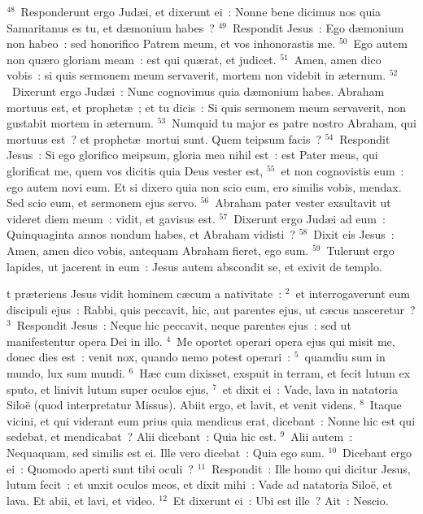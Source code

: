 ${}^{48}$~Responderunt ergo Jud\ae i, et dixerunt ei~: Nonne bene dicimus nos quia Samaritanus es tu, et d\ae monium habes~?
${}^{49}$~Respondit Jesus~: Ego d\ae monium non habeo~: sed honorifico Patrem meum, et vos inhonorastis me.
${}^{50}$~Ego autem non qu\ae ro gloriam meam~: est qui qu\ae rat, et judicet.
${}^{51}$~Amen, amen dico vobis~: si quis sermonem meum servaverit, mortem non videbit in \ae ternum.
${}^{52}$~Dixerunt ergo Jud\ae i~: Nunc cognovimus quia d\ae monium habes. Abraham mortuus est, et prophet\ae~; et tu dicis~: Si quis sermonem meum servaverit, non gustabit mortem in \ae ternum.
${}^{53}$~Numquid tu major es patre nostro Abraham, qui mortuus est~? et prophet\ae\ mortui sunt. Quem teipsum facis~?
${}^{54}$~Respondit Jesus~: Si ego glorifico meipsum, gloria mea nihil est~: est Pater meus, qui glorificat me, quem vos dicitis quia Deus vester est,
${}^{55}$~et non cognovistis eum~: ego autem novi eum. Et si dixero quia non scio eum, ero similis vobis, mendax. Sed scio eum, et sermonem ejus servo.
${}^{56}$~Abraham pater vester exsultavit ut videret diem meum~: vidit, et gavisus est.
${}^{57}$~Dixerunt ergo Jud\ae i ad eum~: Quinquaginta annos nondum habes, et Abraham vidisti~?
${}^{58}$~Dixit eis Jesus~: Amen, amen dico vobis, antequam Abraham fieret, ego sum.
${}^{59}$~Tulerunt ergo lapides, ut jacerent in eum~: Jesus autem abscondit se, et exivit de templo.

\bchapter
{}t pr\ae teriens Jesus vidit hominem c\ae cum a nativitate~:
${}^{2}$~et interrogaverunt eum discipuli ejus~: Rabbi, quis peccavit, hic, aut parentes ejus, ut c\ae cus nasceretur~?
${}^{3}$~Respondit Jesus~: Neque hic peccavit, neque parentes ejus~: sed ut manifestentur opera Dei in illo.
${}^{4}$~Me oportet operari opera ejus qui misit me, donec dies est~: venit nox, quando nemo potest operari~:
${}^{5}$~quamdiu sum in mundo, lux sum mundi.
${}^{6}$~H\ae c cum dixisset, exspuit in terram, et fecit lutum ex sputo, et linivit lutum super oculos ejus,
${}^{7}$~et dixit ei~: Vade, lava in natatoria Silo\"e (quod interpretatur Missus). Abiit ergo, et lavit, et venit videns.
${}^{8}$~Itaque vicini, et qui viderant eum prius quia mendicus erat, dicebant~: Nonne hic est qui sedebat, et mendicabat~? Alii dicebant~: Quia hic est.
${}^{9}$~Alii autem~: Nequaquam, sed similis est ei. Ille vero dicebat~: Quia ego sum.
${}^{10}$~Dicebant ergo ei~: Quomodo aperti sunt tibi oculi~?
${}^{11}$~Respondit~: Ille homo qui dicitur Jesus, lutum fecit~: et unxit oculos meos, et dixit mihi~: Vade ad natatoria Silo\"e, et lava. Et abii, et lavi, et video.
${}^{12}$~Et dixerunt ei~: Ubi est ille~? Ait~: Nescio.


